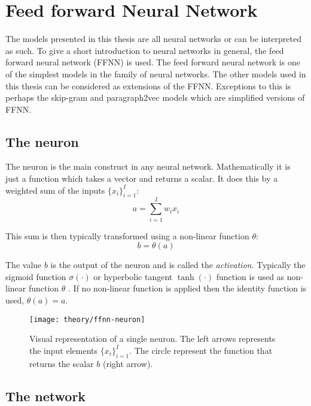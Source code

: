 
\section{Feed forward Neural Network}
\label{sec:theory:ffnn}

The models presented in this thesis are all neural networks or can be interpreted as such. To give a short introduction to neural networks in general, the feed forward neural network (FFNN) is used. The feed forward neural network is one of the simplest models in the family of neural networks. The other models used in this thesis can be considered as extensions of the FFNN. Exceptions to this is perhaps the skip-gram and paragraph2vec models which are simplified versions of FFNN.

\subsection{The neuron}

The neuron is the main construct in any neural network. Mathematically it is just a function which takes a vector and returns a scalar. It does this by a weighted sum of the inputs $\{ x_i \}_{i=1}^I$:
\begin{equation}
a = \sum_{i=1}^I w_{i} x_i
\end{equation}

This sum is then typically transformed using a non-linear function $\theta$:
\begin{equation}
b = \theta(a)
\end{equation}

The value $b$ is the output of the neuron and is called the \textit{activation}. Typically the sigmoid function $\sigma(\cdot)$ or hyperbolic tangent $\tanh(\cdot)$ function is used as non-linear function $\theta$ \cite{bishop}. If no non-linear function is applied then the identity function is used, $\theta(a) = a$.

\begin{figure}[H]
	\centering
	\texttt{[image: theory/ffnn-neuron]}
	\caption{Visual representation of a single neuron. The left arrows represents the input elements $\{ x_i \}_{i=1}^I$. The circle represent the function that returns the scalar $b$ (right arrow).}
\end{figure}

\subsection{The network}


